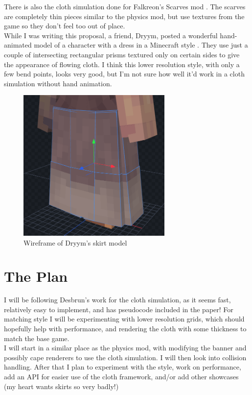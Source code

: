 \documentclass[12pt, twocolumn]{article}
\begin{document}
There is also the cloth simulation done for Falkreon's Scarves mod \cite{scarves}. The scarves are completely thin pieces similar to the physics mod, but use textures from the game so they don't feel too out of place.\\

While I was writing this proposal, a friend, Dryym, posted a wonderful hand-animated model of a character with a dress in a Minecraft style \cite{skirt}. They use just a couple of intersecting rectangular prisms textured only on certain sides to give the appearance of flowing cloth. I think this lower resolution style, with only a few bend points, looks very good, but I'm not sure how well it'd work in a cloth simulation without hand animation.

\begin{figure}[h]
    \begin{center}
        \includegraphics[width=3in]{images/dryym-skirt-blockoutlines-back.png}
    \end{center}
    \caption{Wireframe of Dryym's skirt model}
\end{figure}

\section{The Plan}

I will be following Desbrun's \cite{interanim} work for the cloth simulation, as it seems fast, relatively easy to implement, and has pseudocode included in the paper! For matching style I will be experimenting with lower resolution grids, which should hopefully help with performance, and rendering the cloth with some thickness to match the base game.\\

I will start in a similar place as the physics mod, with modifying the banner and possibly cape renderers to use the cloth simulation. I will then look into collision handling. After that I plan to experiment with the style, work on performance, add an API for easier use of the cloth framework, and/or add other showcases (my heart wants skirts so very badly!)\\
\end{document}
